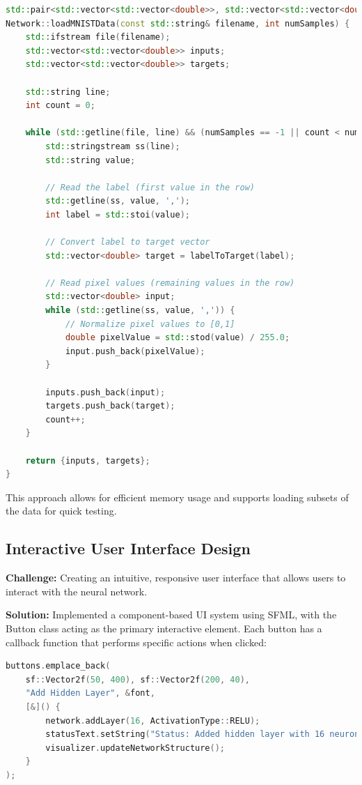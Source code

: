 \documentclass[12pt]{article}
\begin{document}
\begin{lstlisting}[language=C++]
std::pair<std::vector<std::vector<double>>, std::vector<std::vector<double>>> 
Network::loadMNISTData(const std::string& filename, int numSamples) {
    std::ifstream file(filename);
    std::vector<std::vector<double>> inputs;
    std::vector<std::vector<double>> targets;
    
    std::string line;
    int count = 0;
    
    while (std::getline(file, line) && (numSamples == -1 || count < numSamples)) {
        std::stringstream ss(line);
        std::string value;
        
        // Read the label (first value in the row)
        std::getline(ss, value, ',');
        int label = std::stoi(value);
        
        // Convert label to target vector
        std::vector<double> target = labelToTarget(label);
        
        // Read pixel values (remaining values in the row)
        std::vector<double> input;
        while (std::getline(ss, value, ',')) {
            // Normalize pixel values to [0,1]
            double pixelValue = std::stod(value) / 255.0;
            input.push_back(pixelValue);
        }
        
        inputs.push_back(input);
        targets.push_back(target);
        count++;
    }
    
    return {inputs, targets};
}
\end{lstlisting}

This approach allows for efficient memory usage and supports loading subsets of the data for quick testing.

\subsection{Interactive User Interface Design}

\textbf{Challenge:} Creating an intuitive, responsive user interface that allows users to interact with the neural network.

\textbf{Solution:} Implemented a component-based UI system using SFML, with the Button class acting as the primary interactive element. Each button has a callback function that performs specific actions when clicked:

\begin{lstlisting}[language=C++]
buttons.emplace_back(
    sf::Vector2f(50, 400), sf::Vector2f(200, 40), 
    "Add Hidden Layer", &font, 
    [&]() {
        network.addLayer(16, ActivationType::RELU);
        statusText.setString("Status: Added hidden layer with 16 neurons");
        visualizer.updateNetworkStructure();
    }
);
\end{lstlisting}
\end{document}
